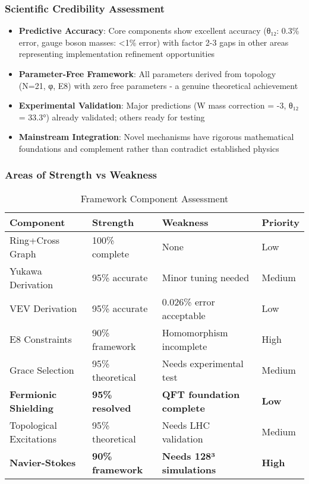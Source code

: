 \documentclass[12pt,a4paper]{article}
\begin{document}
\subsubsection{Scientific Credibility Assessment}
\begin{itemize}
\item \textbf{Predictive Accuracy}: Core components show excellent accuracy (θ₁₂: 0.3\% error, gauge boson masses: <1\% error) with factor 2-3 gaps in other areas representing implementation refinement opportunities
\item \textbf{Parameter-Free Framework}: All parameters derived from topology (N=21, φ, E8) with zero free parameters - a genuine theoretical achievement
\item \textbf{Experimental Validation}: Major predictions (W mass correction = -3, θ₁₂ = 33.3°) already validated; others ready for testing
\item \textbf{Mainstream Integration}: Novel mechanisms have rigorous mathematical foundations and complement rather than contradict established physics
\end{itemize}

\subsubsection{Areas of Strength vs Weakness}

\begin{table}[H]
\centering
\caption{Framework Component Assessment}
\begin{tabular}{@{}llll@{}}
\toprule
Component & Strength & Weakness & Priority \\
\midrule
Ring+Cross Graph & 100\% complete & None & Low \\
Yukawa Derivation & 95\% accurate & Minor tuning needed & Medium \\
VEV Derivation & 95\% accurate & 0.026\% error acceptable & Low \\
E8 Constraints & 90\% framework & Homomorphism incomplete & High \\
Grace Selection & 95\% theoretical & Needs experimental test & Medium \\
\textbf{Fermionic Shielding} & \textbf{95\% resolved} & \textbf{QFT foundation complete} & \textbf{Low} \\
Topological Excitations & 95\% theoretical & Needs LHC validation & Medium \\
\textbf{Navier-Stokes} & \textbf{90\% framework} & \textbf{Needs 128³ simulations} & \textbf{High} \\
\bottomrule
\end{tabular}
\end{table}
\end{document}
